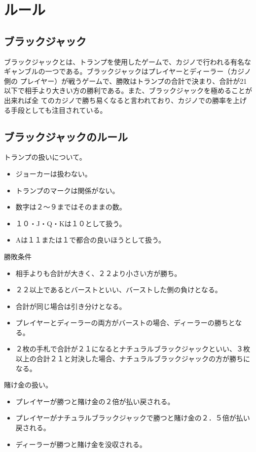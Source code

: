 \section{ルール}
\subsection{ブラックジャック}
ブラックジャックとは、トランプを使用したゲームで、カジノで行われる有名なギャンブルの一つである。ブラックジャックはプレイヤーとディーラー（カジノ側の
プレイヤー）が戦うゲームで、勝敗はトランプの合計で決まり、合計が21以下で相手より大きい方の勝利である。また、ブラックジャックを極めることが出来れば全
てのカジノで勝ち易くなると言われており、カジノでの勝率を上げる手段としても注目されている。

\subsection{ブラックジャックのルール}
トランプの扱いについて。
\begin{itemize}
\item ジョーカーは扱わない。
\item トランプのマークは関係がない。
\item 数字は２～９まではそのままの数。
\item １０・J・Q・Kは１０として扱う。
\item Aは１１または１で都合の良いほうとして扱う。
\end{itemize}
勝敗条件
\begin{itemize}
\item 相手よりも合計が大きく、２２より小さい方が勝ち。
\item ２２以上であるとバーストといい、バーストした側の負けとなる。
\item 合計が同じ場合は引き分けとなる。
\item プレイヤーとディーラーの両方がバーストの場合、ディーラーの勝ちとなる。
\item ２枚の手札で合計が２１になるとナチュラルブラックジャックといい、３枚以上の合計２１と対決した場合、ナチュラルブラックジャックの方が勝ちになる。
\end{itemize}
賭け金の扱い。
\begin{itemize}
\item プレイヤーが勝つと賭け金の２倍が払い戻される。
\item プレイヤーがナチュラルブラックジャックで勝つと賭け金の２．５倍が払い戻される。
\item ディーラーが勝つと賭け金を没収される。
\end{itemize}
